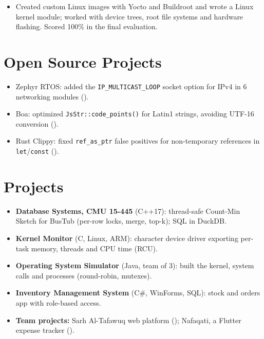 \documentclass[10pt]{article}
\begin{document}
\begin{itemize}
  \item Created custom Linux images with Yocto and Buildroot and wrote a Linux kernel module; worked with device trees, root file systems and hardware flashing. Scored 100\% in the final evaluation.
\end{itemize}

\section*{Open Source Projects}
\begin{itemize}
  \item Zephyr RTOS: added the \texttt{IP\_MULTICAST\_LOOP} socket option for IPv4 in 6 networking modules ().
  \item Boa: optimized \texttt{JsStr::code\_points()} for Latin1 strings, avoiding UTF-16 conversion ().
  \item Rust Clippy: fixed \texttt{ref\_as\_ptr} false positives for non-temporary references in \texttt{let}/\texttt{const} ().
\end{itemize}

\section*{Projects}
\begin{itemize}
  \item \textbf{Database Systems, CMU 15-445} (C++17): thread-safe Count-Min Sketch for BusTub (per-row locks, merge, top-k); SQL in DuckDB. 
  \item \textbf{Kernel Monitor} (C, Linux, ARM): character device driver exporting per-task memory, threads and CPU time (RCU). 
  \item \textbf{Operating System Simulator} (Java, team of 3): built the kernel, system calls and processes (round-robin, mutexes). 
  \item \textbf{Inventory Management System} (C\#, WinForms, SQL): stock and orders app with role-based access. 
  \item \textbf{Team projects:} Sarh Al-Tafawuq web platform (); Nafaqati, a Flutter expense tracker ().
\end{itemize}
\end{document}
